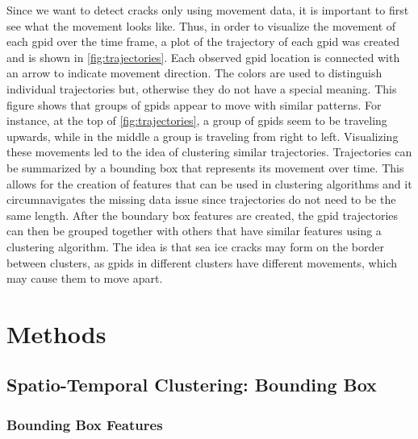 \documentclass[12pt]{article}
\begin{document}
Since we want to detect cracks only using movement data, it is important
to first see what the movement looks like. Thus, in order to visualize
the movement of each gpid over the time frame, a plot of the trajectory
of each gpid was created and is shown in \cref{fig:trajectories}. Each
observed gpid location is connected with an arrow to indicate movement
direction. The colors are used to distinguish individual trajectories
but, otherwise they do not have a special meaning. This figure shows
that groups of gpids appear to move with similar patterns. For instance,
at the top of \cref{fig:trajectories}, a group of gpids seem to be
traveling upwards, while in the middle a group is traveling from right
to left. Visualizing these movements led to the idea of clustering
similar trajectories. Trajectories can be summarized by a bounding box
that represents its movement over time. This allows for the creation of
features that can be used in clustering algorithms and it
circumnavigates the missing data issue since trajectories do not need to
be the same length. After the boundary box features are created, the
gpid trajectories can then be grouped together with others that have
similar features using a clustering algorithm. The idea is that sea ice
cracks may form on the border between clusters, as gpids in different
clusters have different movements, which may cause them to move apart.

\hypertarget{methods}{%
\section{Methods}\label{methods}}

\hypertarget{spatio-temporal-clustering-bounding-box}{%
\subsection{Spatio-Temporal Clustering: Bounding
Box}\label{spatio-temporal-clustering-bounding-box}}

\hypertarget{bounding-box-features}{%
\subsubsection{Bounding Box Features}\label{bounding-box-features}}
\end{document}
